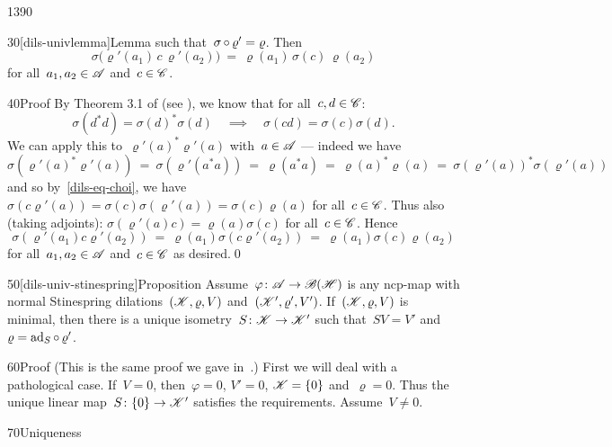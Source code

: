 \begin{parsec}{1390}
\begin{point}{30}[dils-univlemma]{Lemma}
        such that~$\sigma \mathop{\circ} \varrho' = \varrho$. Then
\begin{equation*}
\sigma\bigl(\varrho'(a_1)\,c\, \varrho'(a_2)\bigr) \ =\   \varrho(a_1) \,\sigma(c) \,\varrho(a_2)
\end{equation*}
    for all~$a_1,a_2 \in \mathscr{A}$ and~$c \in \mathscr{C}$.
\begin{point}{40}{Proof}%
By Theorem 3.1 of \cite{choi} (see ),
we know that for all~$c,d\in\mathscr{C}$:
\begin{equation}
    \sigma(d^*d) = \sigma(d)^*\sigma(d) \quad \implies \quad
    \sigma(cd) = \sigma(c)\sigma(d).\label{dils-eq-choi}
\end{equation}
We can apply this to~$\varrho'(a)^*\varrho'(a)$
with~$a \in \mathscr{A}$ --- indeed we have
\begin{equation*}
\sigma(\varrho'(a)^* \varrho'(a))
  \   =\ \sigma(\varrho'(a^*a))
  \  =\ \varrho(a^*a)
  \  =\ \varrho(a)^*\varrho(a)
  \  =\ \sigma(\varrho'(a))^*\sigma(\varrho'(a))
\end{equation*}
and so by~\eqref{dils-eq-choi},
    we have~$\sigma(c\varrho'(a))
        = \sigma(c)\sigma(\varrho'(a)) = \sigma(c)\varrho(a)$
        for all~$c \in \mathscr{C}$.
Thus also (taking adjoints):
$\sigma(\varrho'(a)c) = \varrho(a)\sigma(c)$ for all~$c \in \mathscr{C}$.
Hence
\begin{equation*}
\sigma(\varrho'(a_1)c\varrho'(a_2))
            \ =\  \varrho(a_1)\sigma(c \varrho'(a_2))
            \ =\  \varrho(a_1) \sigma(c) \varrho(a_2)
\end{equation*}
    for all~$a_1,a_2 \in \mathscr{A}$ and~$c\in \mathscr{C}$ as desired.\qed
\end{point}
\end{point}
\begin{point}{50}[dils-univ-stinespring]{Proposition}%
    Assume~$\varphi\colon \mathscr{A} \to \mathscr{B}(\mathscr{H})$
        is any ncp-map with normal
        Stinespring dilations~$(\mathscr{K}, \varrho, V)$
    and~$(\mathscr{K}', \varrho', V')$.
        If~$(\mathscr{K},\varrho,V)$ is minimal,
        then there is a unique isometry~$S\colon \mathscr{K} \to \mathscr{K}'$
        such that~$SV=V'$ and~$\varrho = \mathrm{ad}_S\mathop{\circ} \varrho'$.
\begin{point}{60}{Proof}
(This is the same proof we gave in~\cite{wwpaschke}.)
First we will deal with a pathological case.
If~$V = 0$, then~$\varphi = 0$, $V' = 0$, $\mathscr{K} = \{0\}$
and~$\varrho = 0$.  Thus the unique linear map~$S\colon \{0\} \to \mathscr{K}'$
satisfies the requirements.  Assume~$V \neq 0$.
\begin{point}{70}{Uniqueness}%

\end{point}
\end{point}
\end{point}
\end{parsec}
